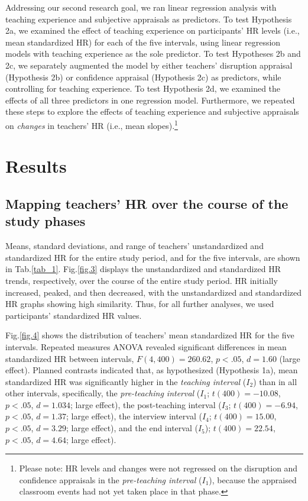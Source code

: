 \documentclass[preprint,
3p]{elsarticle} %
\begin{document}
Addressing our second research goal, we ran linear regression analysis
with teaching experience and subjective appraisals as predictors. To
test Hypothesis 2a, we examined the effect of teaching experience on
participants' HR levels (i.e., mean standardized HR) for each of the
five intervals, using linear regression models with teaching experience
as the sole predictor. To test Hypotheses 2b and 2c, we separately
augmented the model by either teachers' disruption appraisal (Hypothesis
2b) or confidence appraisal (Hypothesis 2c) as predictors, while
controlling for teaching experience. To test Hypothesis 2d, we examined
the effects of all three predictors in one regression model.
Furthermore, we repeated these steps to explore the effects of teaching
experience and subjective appraisals on \emph{changes} in teachers' HR
(i.e., mean slopes).\footnote{Please note: HR levels and changes were
  not regressed on the disruption and confidence appraisals in the
  \emph{pre-teaching interval} (\(I_1\)), because the appraised
  classroom events had not yet taken place in that phase.}

\section{Results}\label{results}

\subsection{Mapping teachers' HR over the course of the study
phases}\label{mapping-teachers-hr-over-the-course-of-the-study-phases}

Means, standard deviations, and range of teachers' unstandardized and
standardized HR for the entire study period, and for the five intervals,
are shown in Tab.\ref{tab_1}. Fig.\ref{fig.3} displays the
unstandardized and standardized HR trends, respectively, over the course
of the entire study period. HR initially increased, peaked, and then
decreased, with the unstandardized and standardized HR graphs showing
high similarity. Thus, for all further analyses, we used participants'
standardized HR values.

Fig.\ref{fig.4} shows the distribution of teachers' mean standardized HR
for the five intervals. Repeated measures ANOVA revealed significant
differences in mean standardized HR between intervals,
\(F(4, 400) = 260.62\), \(p < .05\), \(d = 1.60\) (large effect).
Planned contrasts indicated that, as hypothesized (Hypothesis 1a), mean
standardized HR was significantly higher in the \emph{teaching interval}
(\(I_2\)) than in all other intervals, specifically, the
\emph{pre-teaching interval} (\(I_1\); \(t(400) = -10.08\), \(p < .05\),
\(d = 1.034\); large effect), the post-teaching interval (\(I_3\);
\(t(400) = -6.94\), \(p < .05\), \(d = 1.37\); large effect), the
interview interval (\(I_4\); \(t(400) = 15.00\), \(p < .05\),
\(d = 3.29\); large effect), and the end interval (\(I_5\));
\(t(400) = 22.54\), \(p < .05\), \(d = 4.64\); large effect).
\end{document}
